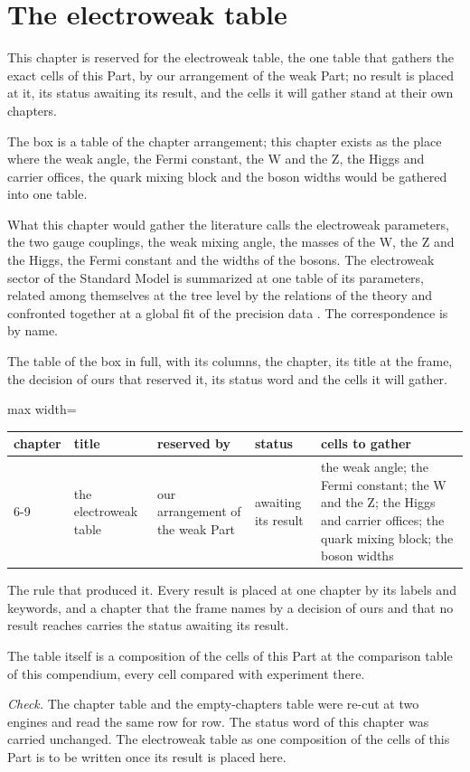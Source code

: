 \section{The electroweak table}\label{mod:VI-9-electroweak-table}
\begin{chtable}
This chapter is reserved for the electroweak table, the one table that gathers the exact cells of this Part, by our arrangement of the weak Part; no result is placed at it, its status awaiting its result, and the cells it will gather stand at their own chapters.
\end{chtable}
\chdeps{}{}
The box is a table of the chapter arrangement; this chapter exists as the place where the weak angle, the Fermi constant, the W and the Z, the Higgs and carrier offices, the quark mixing block and the boson widths would be gathered into one table.
\begin{chbridge}
What this chapter would gather the literature calls the electroweak parameters, the two gauge couplings, the weak mixing angle, the masses of the W, the Z and the Higgs, the Fermi constant and the widths of the bosons. The electroweak sector of the Standard Model is summarized at one table of its parameters, related among themselves at the tree level by the relations of the theory and confronted together at a global fit of the precision data \cite{Glashow1961,Weinberg1967,Salam1968}. The correspondence is by name.
\end{chbridge}
\begin{chproof}[instrument]
The table of the box in full, with its columns, the chapter, its title at the frame, the decision of ours that reserved it, its status word and the cells it will gather.
\begin{center}\small
\begin{adjustbox}{max width=\linewidth}\begin{tabular}{lllll}
\hline
chapter & title & reserved by & status & cells to gather \\
\hline
6-9 & the electroweak table & our arrangement of the weak Part & awaiting its result & the weak angle; the Fermi constant; the W and the Z; the Higgs and carrier offices; the quark mixing block; the boson widths \\
\hline
\end{tabular}\end{adjustbox}
\end{center}
The rule that produced it. Every result is placed at one chapter by its labels and keywords, and a chapter that the frame names by a decision of ours and that no result reaches carries the status awaiting its result.

The table itself is a composition of the cells of this Part at the comparison table of this compendium, every cell compared with experiment there.

\emph{Check.} The chapter table and the empty-chapters table were re-cut at two engines and read the same row for row. The status word of this chapter was carried unchanged.
The electroweak table as one composition of the cells of this Part is to be written once its result is placed here.
\end{chproof}
